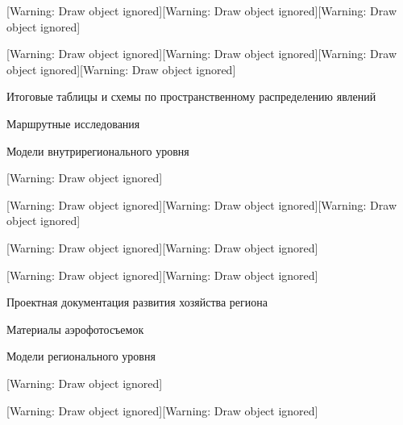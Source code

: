 \documentclass{report}
\begin{document}
[Warning: Draw object ignored][Warning: Draw object ignored][Warning: Draw object ignored]

[Warning: Draw object ignored][Warning: Draw object ignored][Warning: Draw object ignored][Warning: Draw object ignored]



\begin{center}
\begin{minipage}{3.863cm}
Итоговые таблицы и схемы по пространственному распределению явлений
\end{minipage}
\end{center}


\begin{center}
\begin{minipage}{4.117cm}
Маршрутные исследования
\end{minipage}
\end{center}
\begin{center}
\begin{minipage}{3.863cm}
Модели внутрирегионального уровня
\end{minipage}
\end{center}
[Warning: Draw object ignored]

[Warning: Draw object ignored][Warning: Draw object ignored][Warning: Draw object ignored]

[Warning: Draw object ignored][Warning: Draw object ignored]

[Warning: Draw object ignored][Warning: Draw object ignored]



\begin{center}
\begin{minipage}{3.863cm}
Проектная документация развития хозяйства региона
\end{minipage}
\end{center}


\begin{center}
\begin{minipage}{4.117cm}
Материалы аэрофотосъемок
\end{minipage}
\end{center}
\begin{center}
\begin{minipage}{3.863cm}
Модели регионального уровня
\end{minipage}
\end{center}
[Warning: Draw object ignored]

[Warning: Draw object ignored][Warning: Draw object ignored]
\end{document}
